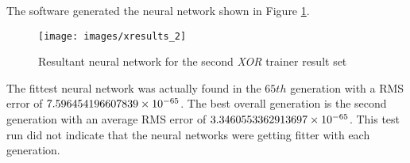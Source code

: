 The software generated the neural network shown in Figure \ref{xresults_2}.

\begin{figure}[htb!]
  \centering
  \texttt{[image: images/xresults\_2]}
  \caption{Resultant neural network for the second {\it XOR} trainer result set}
  \label{xresults_2}
\end{figure}

The fittest neural network was actually found in the $65{th}$
generation with a RMS error of $7.596454196607839\times 10^{-65}$.
The best overall generation is the second generation with an average
RMS error of $3.3460553362913697\times 10^{-65}$.
This test run did not indicate that the neural networks were getting
fitter with each generation. 

